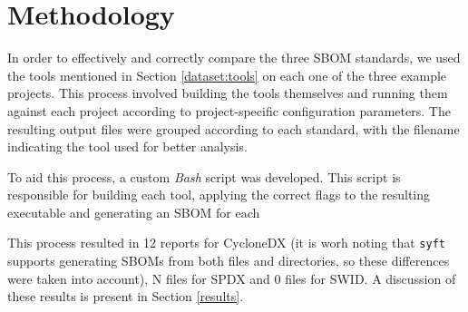 \section{Methodology}

In order to effectively and correctly compare the three SBOM standards, we used the tools mentioned in Section \ref{dataset:tools} on each one of the three example projects. This process involved building the tools themselves and running them against each project according to project-specific configuration parameters. The resulting output files were grouped according to each standard, with the filename indicating the tool used for better analysis.

To aid this process, a custom \emph{Bash} script was developed. This script is responsible for building each tool, applying the correct flags to the resulting executable and generating an SBOM for each 

This process resulted in 12 reports for CycloneDX (it is worh noting that \verb|syft| supports generating SBOMs from both files and directories, so these differences were taken into account), N files for SPDX and 0 files for SWID. A discussion of these results is present in Section \ref{results}.